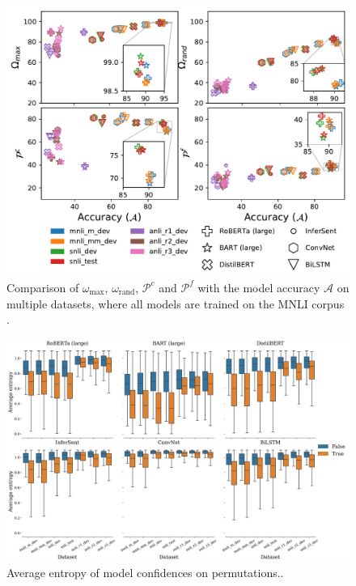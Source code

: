 \documentclass[letterpaper, 12pt]{report}
\begin{document}
\begin{figure}[htbp]
\centering
\includegraphics[width=.9\linewidth]{figs/unli/comb_plot_all.pdf}
\caption{Comparison of \(\omega_{\text{max}}\), \(\omega_{\text{rand}}\), \(\mathcal{P}^{c}\) and \(\mathcal{P}^{f}\) with the model accuracy \(\mathcal{A}\) on multiple datasets, where all models are trained on the MNLI corpus \cite{williams-etal-2018-broad}.}
\end{figure}

\begin{figure}[htbp]
\centering
\includegraphics[width=.9\linewidth]{figs/unli/all_entropy.png}
\caption{Average entropy of model confidences on permutations..}
\end{figure}
\end{document}
